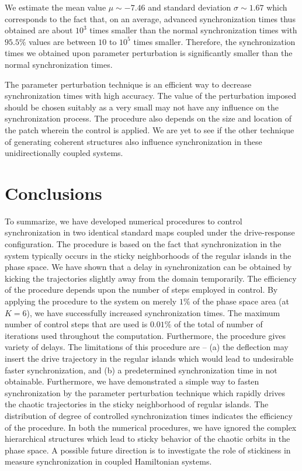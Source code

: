 \documentclass[reprint,amsmath,amssymb,aps,pre]{revtex4-1}
\begin{document}
We estimate the mean value $\mu \sim -7.46$ and standard deviation $\sigma 
\sim1.67$ which corresponds to the fact that, on an average, advanced 
synchronization times thus obtained are about $10^3$ times smaller than the 
normal synchronization times with $95.5\%$ values are between $10$ to $10^5$ 
times smaller.  Therefore, the synchronization times we obtained upon 
parameter perturbation is significantly smaller than the normal 
synchronization times.

The parameter perturbation technique is an efficient way to decrease synchronization times with high accuracy.  The value of the perturbation imposed should be chosen suitably as a very small may not have any influence on the synchronization process. The procedure also depends on the size and location of the patch wherein the control is applied. We are yet to see if the other technique of generating coherent structures also influence synchronization in these unidirectionally coupled systems. 


\section{Conclusions}
\label{sec:conclusions}
To summarize, we have developed numerical procedures to control 
synchronization in two identical standard maps coupled under the 
drive-response configuration. The procedure is based on the fact that 
synchronization in the system typically occurs in the sticky neighborhoods of the regular islands in 
the phase space. We have shown that a delay in synchronization can be obtained 
by kicking the trajectories slightly away from the domain temporarily. The 
efficiency of the procedure depends upon the number of steps employed in 
control. By applying the procedure to the system on merely $1\%$ of the phase 
space area (at $K = 6$), we have successfully increased synchronization times. 
The maximum number of control steps that are used is $0.01\%$ of the total of 
number of iterations used throughout the computation.  Furthermore, the 
procedure gives variety of delays. The limitations of this procedure are -- (a) 
the deflection may insert the drive trajectory in the regular islands which 
would lead to undesirable faster synchronization, and (b) a predetermined 
synchronization time in not obtainable. Furthermore, we have demonstrated a 
simple way to fasten synchronization by the parameter perturbation technique 
which rapidly drives the chaotic trajectories in the sticky neighborhood of 
regular islands. The distribution of degree of controlled synchronization 
times indicates the efficiency of the procedure. In both the numerical 
procedures, we have ignored the complex hierarchical structures which lead to 
sticky behavior of the chaotic orbits in the phase space. A possible future 
direction is to investigate the role of stickiness in measure synchronization 
in coupled Hamiltonian systems.
\end{document}
